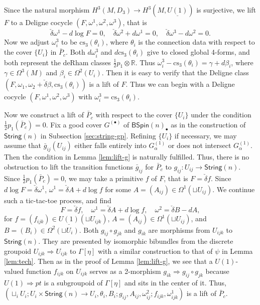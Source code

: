 \documentclass[letterpaper,10pt, oneside]{article} %
\newcommand{\String}{\mathsf{String}}%
\newcommand{\BSpin}{\mathsf{BSpin}}%
\newcommand{\cs}{\mathrm{cs}}
\newcommand{\R}{\mathbb R}\newcommand{\Z}{\mathbb Z}
\def\qed{\hfill ~\vrule height6pt width6pt depth0pt}
\newcommand{\half}{\frac{1}{2}}
\begin{document}
Since the natural morphism $H^3(M, D_3) \to H^3(M, \underline{U(1)})$ is surjective, we lift $F$ to a Deligne cocycle $(F, \omega^1, \omega^2, \omega^3) $, that is
\begin{equation}\label{eq:F-omegas}
\check{\delta} \omega^1 - d\log F = 0, \quad \check{\delta}\omega^2 + d \omega^1 = 0, \quad \check{\delta}\omega^3- d\omega^2 = 0.
\end{equation}
Now we adjust $\omega^3_i$ to be $\cs_3(\theta_i)$, where $\theta_i$ is the connection data with respect to the cover $\{U_i\}$ in $\bar{P}_c$. Both $d\omega^3_i$ and $d\cs_3(\theta_i)$ give to closed global 4-forms, and both represent the deRham classes $ \half p_1 \otimes \R$. Thus $\omega^3_i - \cs_3(\theta_i) = \gamma+d\beta_i$, where $\gamma\in \Omega^3(M)$ and $\beta_i\in\Omega^2(U_i)$. Then it is easy to verify that the Deligne class $(F, \omega_1, \omega_2+ \check{\delta} \beta, \cs_3(\theta_i) )$ is a lift of $F$. Thus we can begin with a Deligne cocycle $(F, \omega^1, \omega^2, \omega^3) $ with $\omega^3_i=\cs_3(\theta_i)$.

Now we construct a lift of $\bar{P}_c$ with respect to the cover $\{U_i\}$ under the condition $\half
p_1(\bar{P}_c)=0$. Fix a good cover $G^{(\bullet)}$ of $\BSpin(n)_\bullet$ as in the construction of $\String(n)$ in Subsection \ref{sec:string-gp}. Refining $\{U_i\}$ if necessary,  we may assume that $\bar{g}_{ij} (U_{ij})$ either falls entirely into  $G^{(1)}_{\alpha}$ or does not intersect $G^{(1)}_\alpha$. Then the condition in Lemma \ref{lem:lift-g} is naturally fulfilled. Thus, there is no obstruction to lift the transition functions $\bar{g}_{ij}$ for $\bar{P}_c$ to $g_{ij}: U_{ij}\to \String(n)$.  Since  $\half
p_1(\bar{P}_c)=0$, we may take a primitive $f$ of $F$, that is $F=\check{\delta} f$. Since $d\log F = \check{\delta}\omega^1$, $\omega^1 = \check{\delta} A + d\log f$ for some $A=(A_{ij}) \in \Omega^1(\sqcup U_{ij})$. We continue such a tic-tac-toe process, and find
\begin{equation} \label{eq:fAB}
F=\check{\delta} f, \quad \omega^1 = \check{\delta} A + d\log f, \quad \omega^2=\check{\delta}B - dA,
\end{equation}
for $f=(f_{ijk}) \in \underline{U(1)}(\sqcup U_{ijk})$,  $A=(A_{ij}) \in \Omega^1(\sqcup U_{ij})$, and $B=(B_i) \in \Omega^2(\sqcup U_i)$.  Both $g_{ij}\circ g_{jk}$ and $g_{ik}$ are morphisms from $U_{ijk}$ to $\String(n)$. They are presented by isomorphic bibundles from the discrete groupoid $U_{ijk}\Rightarrow U_{ijk}$ to  $\Gamma[\eta]$ with a similar construction to that of $\psi$ in Lemma \ref{lem:tech}. Then as in the proof of Lemma \ref{lem:lift-g}, we see that a $U(1)$-valued function $f_{ijk}$ on $U_{ijk}$ serves as a 2-morphism $g_{ik}\Rightarrow g_{ij} \circ g_{jk}$ because $U(1)\Rightarrow pt$ is a subgroupoid of $\Gamma[\eta]$ and sits in the center of it.  Thus, $( \sqcup_i
U_{i}; U_i\times \String(n)\to U_i, \theta_i, B_i;
g_{ij}, A_{ij}, \omega^2_{ij}; f_{ijk}, \omega^1_{ijk}) $ is a lift of $\bar{P}_c$. \qed\vspace{3mm}
\end{document}
